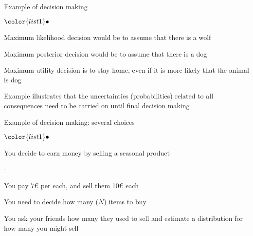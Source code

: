 \documentclass[t]{beamer}
\newenvironment{list1}{
   \begin{list}{$\color{list1}\bullet$}{\itemsep=6pt}}{
  \end{list}}
\newenvironment{list2}{
  \begin{list}{-}{\baselineskip=12pt\itemsep=2pt}}{
  \end{list}}
\begin{document}
\begin{frame}
  
  {\Large\color{navyblue} Example of decision making}

  \begin{list1}
  \item<+-> Maximum likelihood decision would be to assume that there is a wolf
  \item<+-> Maximum posterior decision would be to assume that there is a dog
  \item<+-> Maximum utility decision is to stay home, even if it is more likely that the animal is dog
  \item<+-> Example illustrates that the uncertainties (probabilities)
    related to all consequences need to be carried on until final
    decision making
  \end{list1}

\end{frame}






\begin{frame}{Example of decision making: several choices}

\begin{list1}
\item You decide to earn money by selling a seasonal product
  \begin{list2}
  \item You pay 7€ per each, and sell them 10€ each
  \item You need to decide how many ($N$) items to buy
  \item<2-> You ask your friends how many they used to sell and estimate a
    distribution for how many you might sell
  \end{list2}
\end{list1}

\end{frame}
\end{document}
